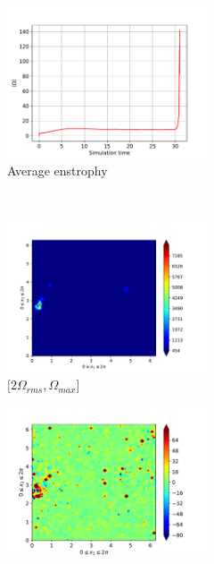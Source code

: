 \begin{figure}[H]
    \begin{subfigure}[H]{0.45\textwidth}
        \includegraphics[height=1.75in]{media/run-cds-65/enst-average1480}
        \caption{Average enstrophy}
    \end{subfigure}
    ~
    \begin{subfigure}[H]{0.45\textwidth}
        \includegraphics[height=1.75in]{media/run-cds-65/enst-2-1480}
        \caption{$[2\Omega_{rms}, \Omega_{max} $] }
    \end{subfigure}
    \newline
    \begin{subfigure}[H]{0.45\textwidth}
        \includegraphics[height=1.75in]{media/run-cds-65/enst-1480}

\end{subfigure}
\end{figure}

